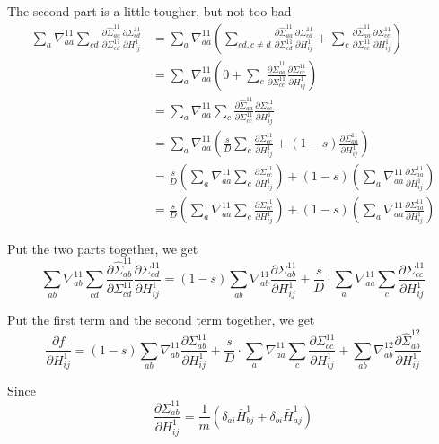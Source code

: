 \documentclass[12pt]{article}
\begin{document}
The second part is a little tougher, but not too bad
\begin{align*}
\sum_{a}\nabla^{11}_{aa} \sum_{cd}\frac{\partial \hat\Sigma_{aa}^{11}}{\partial \Sigma_{cd}^{11}} \frac{\partial \Sigma^{11}_{cd}}{\partial H^1_{ij}}
&= \sum_{a}\nabla^{11}_{aa} \left(\sum_{cd, c\neq d}\frac{\partial \hat\Sigma_{aa}^{11}}{\partial \Sigma_{cd}^{11}} \frac{\partial \Sigma^{11}_{cd}}{\partial H^1_{ij}}
  +\sum_{c}\frac{\partial\hat\Sigma_{aa}^{11}}{\partial\Sigma_{cc}^{11}} \frac{\partial\Sigma^{11}_{cc}}{\partial H^1_{ij}}\right)\\
&=  \sum_{a}\nabla^{11}_{aa} \left(0
+ \sum_{c}\frac{\partial\hat\Sigma_{aa}^{11}}{\partial\Sigma_{cc}^{11}} \frac{\partial\Sigma^{11}_{cc}}{\partial H^1_{ij}}\right)\\
&=  \sum_{a}\nabla^{11}_{aa} \sum_{c}\frac{\partial\hat\Sigma_{aa}^{11}}{\partial\Sigma_{cc}^{11}} \frac{\partial\Sigma^{11}_{cc}}{\partial H^1_{ij}}\\
&=  \sum_{a}\nabla^{11}_{aa} \left(\frac{s}{D}\sum_{c}\frac{\partial\Sigma^{11}_{cc}}{\partial H^1_{ij}} + (1-s)\frac{\partial\Sigma^{11}_{aa}}{\partial H^1_{ij}}\right)\\
&= \frac{s}{D} \left(\sum_{a}\nabla^{11}_{aa} \sum_{c}\frac{\partial\Sigma^{11}_{cc}}{\partial H^1_{ij}}\right)
  + (1-s)\left(\sum_{a}\nabla^{11}_{aa}\frac{\partial\Sigma^{11}_{aa}}{\partial H^1_{ij}}\right)\\
&= \frac{s}{D} \left(\sum_{a}\nabla^{11}_{aa} \sum_{c}\frac{\partial\Sigma^{11}_{cc}}{\partial H^1_{ij}}\right)
+ (1-s)\left(\sum_{a}\nabla^{11}_{aa}\frac{\partial\Sigma^{11}_{aa}}{\partial H^1_{ij}}\right)
\end{align*}

Put the two parts together, we get 
\[\sum_{ab}\nabla^{11}_{ab} \sum_{cd}\frac{\partial \hat\Sigma_{ab}^{11}}{\partial \Sigma_{cd}^{11}} \frac{\partial \Sigma^{11}_{cd}}{\partial H^1_{ij}}
= (1 - s) \sum_{ab}\nabla_{ab}^{11}\frac{\partial \Sigma_{ab}^{11}}{\partial H^1_{ij}} + \frac{s}{D}\cdot \sum_{a}\nabla^{11}_{aa} \sum_{c}\frac{\partial\Sigma^{11}_{cc}}{\partial H^1_{ij}}
\]

Put the first term and the second term together, we get
\[\frac{\partial f}{\partial H^1_{ij}} = (1 - s) \sum_{ab}\nabla_{ab}^{11}\frac{\partial \Sigma_{ab}^{11}}{\partial H^1_{ij}} + \frac{s}{D}\cdot \sum_{a}\nabla^{11}_{aa} \sum_{c}\frac{\partial\Sigma^{11}_{cc}}{\partial H^1_{ij}} + \sum_{ab} \nabla^{12}_{ab}\frac{\partial\hat\Sigma^{12}_{ab}}{\partial H^1_{ij}}\]

Since 
\[\frac{\partial\Sigma^{11}_{ab}}{\partial H^1_{ij}} = \frac{1}{m} (\delta_{ai}\bar H^1_{bj} + \delta_{bi}\bar H^1_{aj})\]
\end{document}
